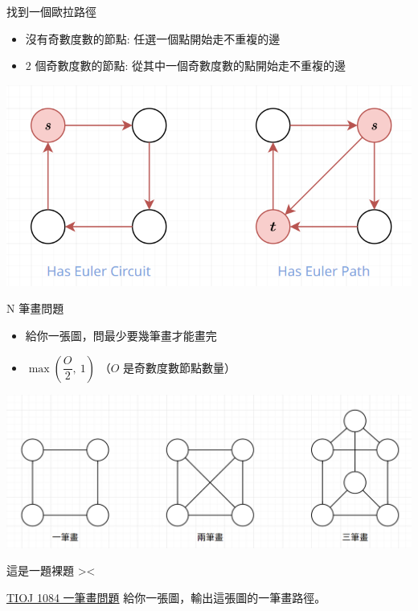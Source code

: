 \documentclass[aspectratio=169]{beamer}
\begin{document}
    \begin{frame}{找到一個歐拉路徑}
        \begin{itemize}
            \item 沒有奇數度數的節點: 任選一個點開始走不重複的邊
            \item $2$ 個奇數度數的節點: 從其中一個奇數度數的點開始走不重複的邊
        \end{itemize}
        \begin{center}
            \includegraphics[scale=0.5]{images/euler_path.png}
        \end{center}
    \end{frame}
    
    \begin{frame}{N 筆畫問題}
        \begin{itemize}
            \item 給你一張圖，問最少要幾筆畫才能畫完
            \item $\max(\dfrac{O}{2}, \ 1)$  （$O$ 是奇數度數節點數量）
        \end{itemize}
        \begin{center}
            \includegraphics[width=\textwidth]{images/euler_path_2.png}
        \end{center}
    \end{frame}
    
    \begin{frame}{這是一題裸題 ><}
        \begin{block}{\href{https://tioj.ck.tp.edu.tw/problems/1084}{TIOJ 1084 一筆畫問題}}
        給你一張圖，輸出這張圖的一筆畫路徑。
        \end{block}
    \end{frame}
    
\end{document}
